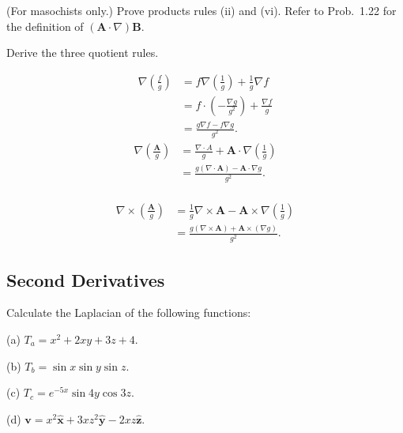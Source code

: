             \begin{prob}[1.23](For masochists only.) Prove products rules (ii) and (vi). Refer to Prob.~1.22 for the definition of $(\mathbf{A}\cdot\nabla)\mathbf{B}$.
            \end{prob}

            \begin{prob}[1.24] Derive the three quotient rules.
            \end{prob}

            \begin{sol}[1.24]
                \begin{equation}
                    \begin{aligned}
                        \nabla\left(\frac{f}{g}\right)&=f\nabla\left(\frac{1}{g}\right) + \frac{1}{g}\nabla f \\
                        &=f\cdot\left(-\frac{\nabla g}{g^2}\right) + \frac{\nabla f}{g} \\
                        &=\frac{g\nabla f - f\nabla g}{g^2}.
                    \end{aligned}
                \end{equation}
                \begin{equation}
                    \begin{aligned}
                        \nabla\left(\frac{\mathbf{A}}{g}\right) &= \frac{\nabla \cdot A}{g} + \mathbf{A}\cdot \nabla \left(\frac{1}{g}\right) \\
                        &=\frac{g\left(\nabla\cdot\mathbf{A}\right)-\mathbf{A}\cdot\nabla g}{g^2}.
                    \end{aligned}
                \end{equation}~\\
                \begin{equation}
                    \begin{aligned}
                        \nabla\times\left(\frac{\mathbf{A}}{g}\right) &= \frac{1}{g} \nabla\times\mathbf{A} - \mathbf{A} \times \nabla\left(\frac{1}{g}\right) \\
                        &=\frac{g(\nabla\times\mathbf{A}) + \mathbf{A}\times(\nabla g)}{g^2}.
                    \end{aligned}
                \end{equation}
            \end{sol}
    \subsection{Second Derivatives}
        \begin{prob}[1.26] Calculate the Laplacian of the following functions:

            \noindent (a) $T_a = x^2 + 2xy + 3z + 4$.
            
            \noindent (b) $T_b = \sin x \sin y \sin z$.

            \noindent (c) $T_c = e^{-5x} \sin 4y \cos 3z$.

            \noindent (d) $\mathbf{v} = x^2\mathbf{\hat{x}} + 3xz^2\mathbf{\hat{y}} - 2xz\mathbf{\hat{z}}$.
        \end{prob}

